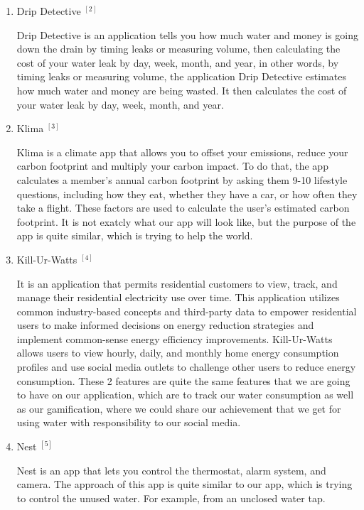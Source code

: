\documentclass[10pt]{article}
\begin{document}
\begin{multicols*}{2}
\begin{enumerate}
  \item {Drip Detective ${ }^{[2]}$}
  
  Drip Detective is an application tells you how much water and money is going down the drain by timing leaks or measuring volume, then calculating the cost of your water leak by day, week, month, and year, in other words, by timing leaks or measuring volume, the application Drip Detective estimates how much water and money are being wasted. It then calculates the cost of your water leak by day, week, month, and year.

  \item {Klima ${ }^{[3]}$}
  
  Klima is a climate app that allows you to offset your emissions, reduce your carbon footprint and multiply your carbon impact. To do that, the app calculates a member's annual carbon footprint by asking them 9-10 lifestyle questions, including how they eat, whether they have a car, or how often they take a flight. These factors are used to calculate the user's estimated carbon footprint. It is not exatcly what our app will look like, but the purpose of the app is quite similar, which is trying to help the world.

  \item {Kill-Ur-Watts ${ }^{[4]}$}
  
  It is an application that permits residential customers to view, track, and manage their residential electricity use over time. This application utilizes common industry-based concepts and third-party data to empower residential users to make informed decisions on energy reduction strategies and implement common-sense energy efficiency improvements. Kill-Ur-Watts allows users to view hourly, daily, and monthly home energy consumption profiles and use social media outlets to challenge other users to reduce energy consumption. These 2 features are quite the same features that we are going to have on our application, which are to track our water consumption as well as our gamification, where we could share our achievement that we get for using water with responsibility to our social media.

  \item {Nest ${ }^{[5]}$}
  
  Nest is an app that lets you control the thermostat, alarm system, and camera. The approach of this app is quite similar to our app, which is trying to control the unused water. For example, from an unclosed water tap.

\end{enumerate}


\end{multicols*}
\end{document}
